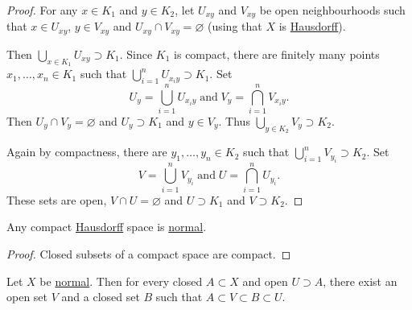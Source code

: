 \documentclass{article}
\renewcommand{\emptyset}{\varnothing}
\begin{document}
\begin{proof}
    For any $x \in K_1$ and $y \in K_2$, let $U_{xy}$ and $V_{xy}$ be open neighbourhoods such that $x \in U_{xy}$, $y \in V_{xy}$ and $U_{xy} \cap V_{xy} = \emptyset$ (using that $X$ is \hyperlink{def:hausdorff}{Hausdorff}).

    Then $\bigcup_{x \in K_1} U_{xy} \supset K_1$. Since $K_1$ is compact, there are finitely many points $x_1, \dotsc, x_n \in K_1$ such that $\bigcup_{i=1}^n U_{x_i y} \supset K_1$. Set
    \begin{equation*}
        U_y = \bigcup_{i=1}^n U_{x_i y} \; \text{and} \; V_y = \bigcap_{i=1}^n V_{x_i y}.
    \end{equation*}
    Then $U_y \cap V_y = \emptyset$ and $U_y \supset K_1$ and $y \in V_y$. Thus $\bigcup_{y \in K_2} V_y \supset K_2$.

    Again by compactness, there are $y_1, \dotsc, y_n \in K_2$ such that $\bigcup_{i=1}^n V_{y_i} \supset K_2$. Set
    \begin{equation*}
        V = \bigcup_{i=1}^n V_{y_i} \; \text{and} \; U = \bigcap_{i=1}^n U_{y_i}.
    \end{equation*}
    These sets are open, $V \cap U = \emptyset$ and $U \supset K_1$ and $V \supset K_2$.
\end{proof}


\begin{cor}
    Any compact \hyperlink{def:hausdorff}{Hausdorff} space is \hyperlink{def:normal}{normal}.
\end{cor}

\begin{proof}
    Closed subsets of a compact space are compact.
\end{proof}


\begin{fact}
    Let $X$ be \hyperlink{def:normal}{normal}.
    Then for every closed $A \subset X$ and open $U \supset A$, there exist an open set $V$ and a closed set $B$ such that $A \subset V \subset B \subset U$.
\end{fact}
\end{document}
